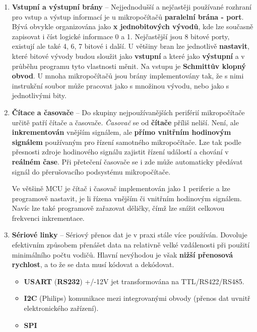 \begin{enumerate}
\item \textbf{Vstupní a výstupní brány} -- Nejjednodušší a nejčastěji používané rozhraní pro vstup a výstup informací je u mikropočítačů \textbf{paralelní brána - port}. Bývá obvykle organizována jako  \textbf{x jednobitových vývodů}, kde lze současně zapisovat i číst logické informace 0 a 1. Nejčastější jsou 8 bitové porty, existují ale také 4, 6, 7 bitové i další. U většiny bran lze jednotlivě \textbf{nastavit}, které bitové vývody budou sloužit jako \textbf{vstupní} a které jako \textbf{výstupní} a v průběhu programu tyto vlastnosti měnit. Na vstupu je \textbf{Schmittův klopný obvod}. U mnoha mikropočítačů jsou brány implementovány tak, že s nimi instrukční soubor může pracovat jako s množinou vývodu, nebo jako s jednotlivými bity.

\item \textbf{Čítace a časovače} -- Do skupiny nejpoužívanějších periférií mikropočítače určitě patří čítače a časovače.
\emph{Časovač} se od \textbf{čítače} příliš neliší. Není, ale \textbf{inkrementován} vnějším signálem, ale \textbf{přímo vnitřním hodinovým signálem} používaným pro řízení samotného mikropočítače. Lze tak podle přesnosti zdroje hodinového signálu zajistit řízení událostí a chování v \textbf{reálném čase}. Při přetečení časovače se i zde může automaticky předávat signál do přerušovacího podsystému mikropočítače.

Ve většině MCU je čítač i časovač implementován jako 1 periferie a lze programově nastavit, je li řízena vnějším či vnitřním hodinovým signálem. Navíc lze také programově zařazovat děličky, čímž lze snížit celkovou frekvenci inkrementace.

\item \textbf{Sériové linky} -- Sériový přenos dat je v praxi stále více používán. Dovoluje efektivním způsobem
přenášet data na relativně velké vzdálenosti při použití minimálního počtu vodičů. Hlavní nevýhodou je však \textbf{nižší přenosová rychlost}, a to že se data musí kódovat a dekódovat.
\begin{itemize}
\item \textbf{USART} (\textbf{RS232}) +/-12V jet transformována na TTL/RS422/RS485.
\item \textbf{I2C} (Philips) komunikace mezi integrovanými obvody (přenos dat uvnitř elektronického zařízení).
\item \textbf{SPI}
\end{itemize}


\end{enumerate}
